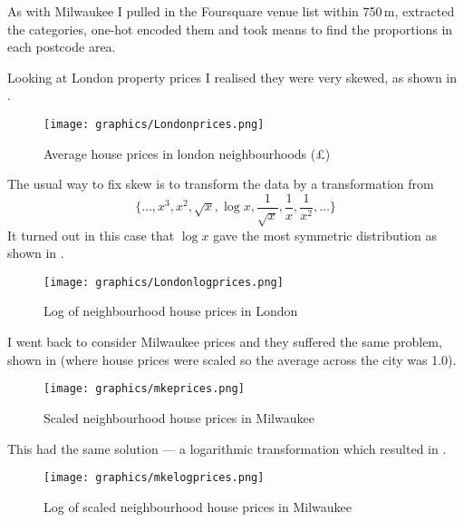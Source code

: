 \documentclass[a4paper,12pt,final,UKenglish]{article}
\begin{document}
            As with Milwaukee I pulled in the Foursquare venue list within 750\,m, extracted the categories, one-hot encoded them and took means to find
            the proportions in each postcode area.

            Looking at London property prices I realised they were very skewed, as shown in .
\begin{figure}[htb]
 \centering
 \texttt{[image: graphics/Londonprices.png]}
 \caption{Average house prices in london neighbourhoods (£)}
 \label{fig:Londonprices}
\end{figure}

            The usual way to fix skew is to transform the data by a transformation from%
            \[\{\ldots,x^3,x^2,\sqrt{\!x},\log{x},\frac1{\sqrt{\!x}},\frac1x,\frac1{x^2},\ldots\}\]
            It turned out in this case that $\log{x}$ gave the most symmetric distribution as shown in .
            
\begin{figure}[htb]
 \centering
 \texttt{[image: graphics/Londonlogprices.png]}
 \caption{Log of neighbourhood house prices in London}
 \label{fig:Londonlogprices}
\end{figure}
            
            I went back to consider Milwaukee prices and they suffered the same problem, shown in  (where house prices were scaled so the average across the city was 1.0).
\begin{figure}[htb]
 \centering
 \texttt{[image: graphics/mkeprices.png]}
 \caption{Scaled neighbourhood house prices in Milwaukee}
 \label{fig:mkeprices}
\end{figure}
            This had the same solution --- a logarithmic transformation which resulted in .
\begin{figure}[htb]
 \centering
 \texttt{[image: graphics/mkelogprices.png]}
 \caption{Log of scaled neighbourhood house prices in Milwaukee}
 \label{fig:mkelogprices}
\end{figure}
\end{document}
